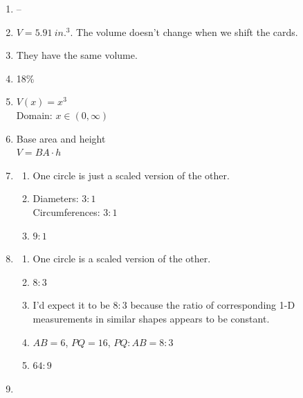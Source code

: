 \documentclass{article}
\begin{document}
\begin{enumerate}
\item --

\item $V = 5.91 \ in.^3$. The volume doesn't change when we shift the cards.

\item They have the same volume.

\item 18\%

\item $V(x) = x^3$ \\
	Domain: $x \in (0, \infty)$

\item Base area and height \\
	$V = BA \cdot h$
	
\item

	\begin{enumerate}
	
	\item One circle is just a scaled version of the other.
	
	\item Diameters: $3:1$ \\
		Circumferences: $3:1$
		
	\item $9:1$
	
	\end{enumerate}
	
\item

	\begin{enumerate}
	
	\item One circle is a scaled version of the other.
	
	\item $8:3$
	
	\item I'd expect it to be $8:3$ because the ratio of corresponding 1-D measurements in similar shapes appears to be constant.
	
	\item $AB = 6$, $PQ = 16$, $PQ:AB = 8:3$
	
	\item $64: 9$
	
	\end{enumerate}
	
\item

	\begin{enumerate}
	

\end{enumerate}
\end{enumerate}
\end{document}

